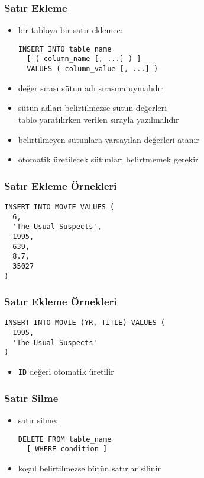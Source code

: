 \documentclass[dvipsnames]{beamer}
\theoremstyle{plain}
\begin{document}
\begin{frame}[fragile]
  \frametitle{Satır Ekleme}
  
  \begin{itemize}
    \item bir tabloya bir satır eklemee:
    \begin{lstlisting}
INSERT INTO table_name
  [ ( column_name [, ...] ) ]
  VALUES ( column_value [, ...] )
    \end{lstlisting}

    \pause
    \item değer sırası sütun adı sırasına uymalıdır
    \item sütun adları belirtilmezse sütun değerleri\\
      tablo yaratılırken verilen sırayla yazılmalıdır

    \pause
    \item belirtilmeyen sütunlara varsayılan değerleri atanır
    \item otomatik üretilecek sütunları belirtmemek gerekir
  \end{itemize}
\end{frame}

\begin{frame}[fragile]
  \frametitle{Satır Ekleme Örnekleri}

  \begin{lstlisting}
INSERT INTO MOVIE VALUES (
  6,
  'The Usual Suspects',
  1995,
  639,
  8.7,
  35027
)
  \end{lstlisting}
\end{frame}

\begin{frame}[fragile]
  \frametitle{Satır Ekleme Örnekleri}

  \begin{lstlisting}
INSERT INTO MOVIE (YR, TITLE) VALUES (
  1995,
  'The Usual Suspects'
)
  \end{lstlisting}

  \begin{itemize}
    \item \texttt{ID} değeri otomatik üretilir
  \end{itemize}  
\end{frame}

\begin{frame}[fragile]
  \frametitle{Satır Silme}

  \begin{itemize}
    \item satır silme:
    \begin{lstlisting}
DELETE FROM table_name
  [ WHERE condition ]
    \end{lstlisting}

    \item koşul belirtilmezse bütün satırlar silinir
  \end{itemize}
\end{frame}
\end{document}
